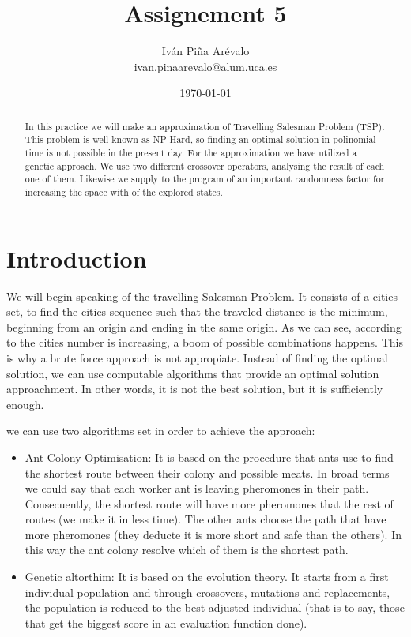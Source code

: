\documentclass{article}
\title{Assignement 5}
\author{Iván Piña Arévalo \\ ivan.pinaarevalo@alum.uca.es}
\date{\today}
\begin{document}
\maketitle

\newpage
\begin{abstract}
    In this practice we will make an approximation of Travelling Salesman Problem (TSP). 
    This problem is well known as NP-Hard, so finding an optimal solution in polinomial time is not possible in the present 
    day. For the approximation we have utilized a genetic approach. We use two different crossover operators, analysing the 
    result of each one of them. Likewise we supply to the program of an important randomness factor for increasing the space 
    with of the explored states.
\end{abstract}

\newpage
\section{Introduction}
We will begin speaking of the travelling Salesman Problem. It consists of a cities set, to find the cities sequence such that 
the traveled distance is the minimum, beginning from an origin and ending in the same origin. As we can see, according to the 
cities number is increasing, a boom of possible combinations happens. This is why a brute force approach is not appropiate.
Instead of finding the optimal solution, we can use computable algorithms that provide an optimal solution approachment. In 
other words, it is not the best solution, but it is sufficiently enough.


we can use two algorithms set in order to achieve the approach:
    \begin{itemize}
        \item Ant Colony Optimisation: It is based on the procedure that ants use to find the shortest route between their 
        colony and possible meats. In broad terms we could say that each worker ant is leaving pheromones in their path. 
        Consecuently, the shortest route will have more pheromones that the rest of routes (we make it in less time). The other
        ants choose the path that have more pheromones (they deducte it is more short and safe than the others). In this way the
        ant colony resolve which of them is the shortest path.
        
        \item Genetic altorthim: It is based on the evolution theory. It starts from a first individual population and through
         crossovers, mutations and replacements, the population is reduced to the best adjusted individual (that is to say, 
         those that get the biggest score in an evaluation function done).
    \end{itemize}
\end{document}

